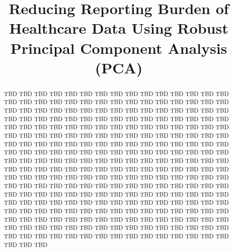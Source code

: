 \documentclass[conference]{IEEEtran}
\begin{document}
\title{ Reducing Reporting Burden of Healthcare Data Using Robust Principal Component Analysis (PCA)}

\author{
\and
{}
\and
{}
}

\maketitle

\thispagestyle{plain}
\pagestyle{plain}

\begin{abstract}
TBD TBD TBD TBD TBD TBD TBD TBD TBD TBD TBD TBD TBD TBD TBD TBD TBD TBD TBD TBD TBD
TBD TBD TBD TBD TBD TBD TBD TBD TBD TBD TBD TBD TBD TBD TBD TBD TBD TBD TBD TBD TBD
TBD TBD TBD TBD TBD TBD TBD TBD TBD TBD TBD TBD TBD TBD TBD TBD TBD TBD TBD TBD TBD
TBD TBD TBD TBD TBD TBD TBD TBD TBD TBD TBD TBD TBD TBD TBD TBD TBD TBD TBD TBD TBD
TBD TBD TBD TBD TBD TBD TBD TBD TBD TBD TBD TBD TBD TBD TBD TBD TBD TBD TBD TBD TBD
TBD TBD TBD TBD TBD TBD TBD TBD TBD TBD TBD TBD TBD TBD TBD TBD TBD TBD TBD TBD TBD
TBD TBD TBD TBD TBD TBD TBD TBD TBD TBD TBD TBD TBD TBD TBD TBD TBD TBD TBD TBD TBD
TBD TBD TBD TBD TBD TBD TBD TBD TBD TBD TBD TBD TBD TBD TBD TBD TBD TBD TBD TBD TBD
TBD TBD TBD TBD TBD TBD TBD TBD TBD TBD TBD TBD TBD TBD TBD TBD TBD TBD TBD TBD TBD
TBD TBD TBD TBD TBD TBD TBD TBD TBD TBD TBD TBD TBD TBD TBD TBD TBD TBD TBD TBD TBD
TBD TBD TBD TBD TBD TBD TBD TBD TBD TBD TBD TBD TBD TBD TBD TBD TBD TBD TBD TBD TBD
TBD TBD TBD TBD TBD TBD TBD TBD TBD TBD TBD TBD TBD TBD TBD TBD TBD TBD TBD TBD TBD
TBD TBD TBD TBD TBD TBD TBD TBD TBD TBD TBD TBD TBD TBD TBD TBD TBD TBD TBD TBD TBD
\end{abstract}
\end{document}
